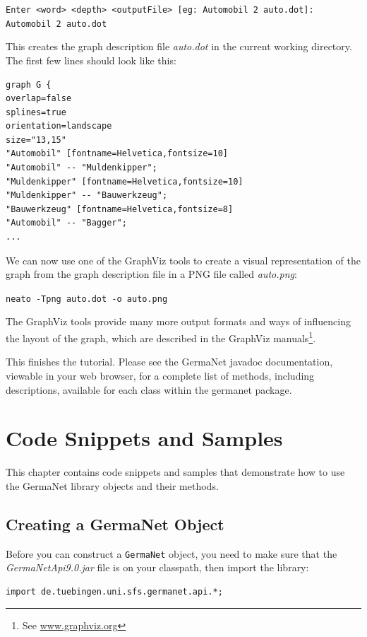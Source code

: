 \documentclass[12pt,a4paper,english,utf8]{report}
\begin{document}
\texttt{Enter <word> <depth> <outputFile> [eg: Automobil 2 auto.dot]:
Automobil 2 auto.dot}

This creates the graph description file \emph{auto.dot} in the current working directory. The first few lines should look like this:

\begin{lstlisting}
graph G {
overlap=false
splines=true
orientation=landscape
size="13,15"
"Automobil" [fontname=Helvetica,fontsize=10]
"Automobil" -- "Muldenkipper";
"Muldenkipper" [fontname=Helvetica,fontsize=10]
"Muldenkipper" -- "Bauwerkzeug";
"Bauwerkzeug" [fontname=Helvetica,fontsize=8]
"Automobil" -- "Bagger";
...
\end{lstlisting}

We can now use one of the GraphViz tools to create a visual representation of the graph from the graph description file in a PNG file called \emph{auto.png}:

\texttt{neato -Tpng auto.dot -o auto.png}

The GraphViz tools provide many more output formats and ways of influencing the layout of the graph, which are described in the GraphViz manuals\footnote{See \href{www.graphviz.org}{www.graphviz.org}}.

This finishes the tutorial. Please see the GermaNet javadoc documentation, viewable in your web browser, for a complete list of methods, including descriptions, available for each class within the germanet package.





\chapter{Code Snippets and Samples}
This chapter contains code snippets and samples that demonstrate how to use the GermaNet library objects and their methods.



\section{Creating a GermaNet Object}
\label{snippetsStart}
Before you can construct a \texttt{GermaNet} object, you need to make sure that the \emph{GermaNetApi9.0.jar} file is on your classpath, then import the library:

\begin{lstlisting}
import de.tuebingen.uni.sfs.germanet.api.*;
\end{lstlisting}
\end{document}

